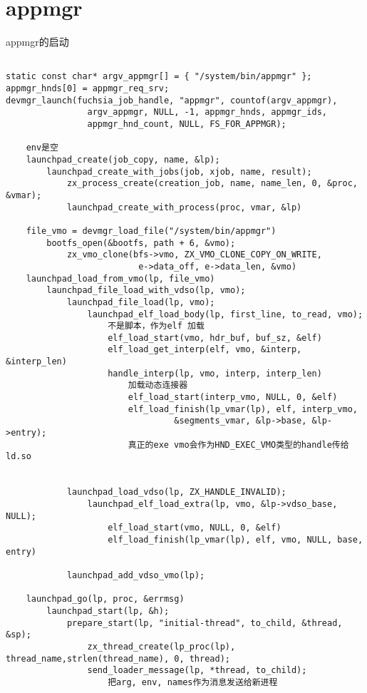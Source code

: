 \section{appmgr}

appmgr的启动

\begin{verbatim}

static const char* argv_appmgr[] = { "/system/bin/appmgr" };
appmgr_hnds[0] = appmgr_req_srv;
devmgr_launch(fuchsia_job_handle, "appmgr", countof(argv_appmgr),
                argv_appmgr, NULL, -1, appmgr_hnds, appmgr_ids,
                appmgr_hnd_count, NULL, FS_FOR_APPMGR);

    env是空
    launchpad_create(job_copy, name, &lp);
        launchpad_create_with_jobs(job, xjob, name, result);
            zx_process_create(creation_job, name, name_len, 0, &proc, &vmar);
            launchpad_create_with_process(proc, vmar, &lp)
    
    file_vmo = devmgr_load_file("/system/bin/appmgr")
        bootfs_open(&bootfs, path + 6, &vmo);
            zx_vmo_clone(bfs->vmo, ZX_VMO_CLONE_COPY_ON_WRITE,
                          e->data_off, e->data_len, &vmo)
    launchpad_load_from_vmo(lp, file_vmo)
        launchpad_file_load_with_vdso(lp, vmo);
            launchpad_file_load(lp, vmo);
                launchpad_elf_load_body(lp, first_line, to_read, vmo);
                    不是脚本，作为elf 加载
                    elf_load_start(vmo, hdr_buf, buf_sz, &elf)
                    elf_load_get_interp(elf, vmo, &interp, &interp_len)
                    handle_interp(lp, vmo, interp, interp_len)
                        加载动态连接器
                        elf_load_start(interp_vmo, NULL, 0, &elf)
                        elf_load_finish(lp_vmar(lp), elf, interp_vmo,
                                 &segments_vmar, &lp->base, &lp->entry);
                        真正的exe vmo会作为HND_EXEC_VMO类型的handle传给ld.so


            launchpad_load_vdso(lp, ZX_HANDLE_INVALID);
                launchpad_elf_load_extra(lp, vmo, &lp->vdso_base, NULL);
                    elf_load_start(vmo, NULL, 0, &elf)
                    elf_load_finish(lp_vmar(lp), elf, vmo, NULL, base, entry)

            launchpad_add_vdso_vmo(lp);

    launchpad_go(lp, proc, &errmsg)
        launchpad_start(lp, &h);
            prepare_start(lp, "initial-thread", to_child, &thread, &sp);
                zx_thread_create(lp_proc(lp), thread_name,strlen(thread_name), 0, thread);
                send_loader_message(lp, *thread, to_child);
                    把arg, env, names作为消息发送给新进程
                

\end{verbatim}
